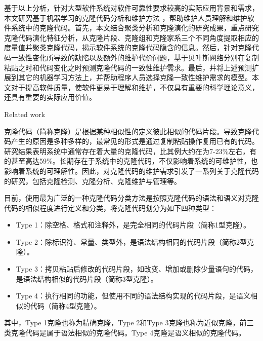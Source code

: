 基于以上分析，针对大型软件系统对软件可靠性要求较高的实际应用背景和需求，本文研究基于机器学习的克隆代码分析和维护方法 ，帮助维护人员理解和维护软件系统中的克隆代码。首先，本文结合聚类分析和克隆演化的研究成果，重点研究克隆代码演化特征分析，从克隆片段、克隆组和克隆家系三个不同角度提取相应的度量值并聚类克隆代码，揭示软件系统的克隆代码隐含的信息。然后，针对克隆代码一致性变化所导致的缺陷以及额外的维护代价问题，基于贝叶斯网络分别在复制粘贴之时和代码变化之时预测克隆代码的一致性维护需求。最后，并将上述预测扩展到其它的机器学习方法上，并帮助程序人员选择克隆一致性维护需求的模型。本文对于提高软件质量，使软件更易于理解和维护，不仅具有重要的科学理论意义，还具有重要的实际应用价值。


{Related work}

克隆代码（简称克隆）是根据某种相似性的定义彼此相似的代码片段\cite{koschke2007survey}。导致克隆代码产生的原因是多种多样的，最常见的形式是通过复制粘贴操作复用已有的代码。研究结果表明系统中通常存在着大量的克隆代码，比其例大约在为7-23\%左右，有的甚至高达59\%\cite{roy2007survey}。长期存在于系统中的克隆代码，不仅影响着系统的可维护性，也影响着系统的可理解性。因此，对克隆代码的维护需求引发了一系列关于克隆代码的研究，包括克隆检测、克隆分析、克隆维护与管理等。

目前，使用最为广泛的一种克隆代码分类方法是按照克隆代码的语法和语义对克隆代码的相似程度进行定义和分类，将克隆代码划分为如下四种类型：
\begin{itemize}
\item {Type 1：除空格、格式和注释外，是完全相同的代码片段（简称1型克隆）。}
\item {Type 2：除标识符、常量、类型外，是语法结构相同的代码片段（简称2型克隆）。}
\item {Type 3：拷贝粘贴后修改的代码片段，如改变、增加或删除少量语句的代码，是语法结构相似的代码片段（简称3型克隆）。}
\item {Type 4：执行相同的功能，但使用不同的语法结构实现的代码片段，是语义相似的代码（简称4型克隆）。}
\end{itemize}

其中，Type 1克隆也称为精确克隆，Type 2和Type 3克隆也称为近似克隆，前三类克隆代码是属于语法相似的克隆代码。Type 4克隆是语义相似的克隆代码。



